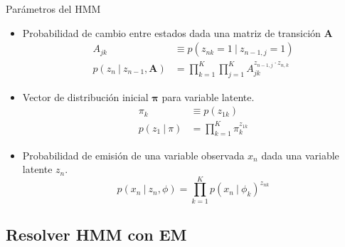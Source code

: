 \documentclass[10pt]{beamer}
\begin{document}
\begin{frame}{Parámetros del HMM}
  \begin{itemize}
    \item Probabilidad de cambio entre estados dada una \alert{matriz de transición} $\mathbf{A}$
      \begin{align}
        A_{jk} &\equiv p(z_{nk} = 1 ~|~  z_{n-1, j} = 1) \\
        p(z_n ~|~ z_{n-1}, \mathbf{A}) &= \prod_{k=1}^K \prod_{j=1}^K A_{jk}^{z_{{n-1}, j} \cdot z_{n,k}}
      \end{align}      
    \item \alert{Vector de distribución inicial} $\bm{\pi}$ para variable latente.
      \begin{align}
        \pi_k &\equiv p(z_{1k}) \\
        p(z_1 ~|~ \pi) &= \prod_{k=1}^K \pi_k^{z_{1k}}
      \end{align}       
    \item \alert{Probabilidad de emisión} de una variable observada $x_n$ dada una variable latente $z_n$.
      \begin{equation}
        p(x_n ~|~ z_n, \phi) = \prod_{k=1}^K p(x_n ~|~ \phi_k) ^ {z_{nk}}
      \end{equation}
  \end{itemize}
\end{frame}

\subsection{Resolver HMM con EM}
\end{document}
